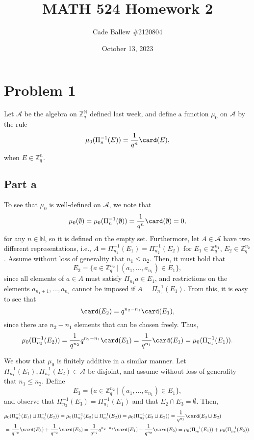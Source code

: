 \documentclass{article}
\title{MATH 524 Homework 2}
\author{Cade Ballew \#2120804}
\date{October 13, 2023}
\begin{document}
	
\maketitle
	
\section{Problem 1}
Let $\mathcal A$ be the algebra on $\mathbb{Z}^\mathbb{N}_q$ defined last week, and define a function $\mu_0$ on $\mathcal A$ by the rule
\[
\mu_0(\Pi_n^{-1}(E))=\frac{1}{q^n}\card(E),
\]
when $E\in\mathbb{Z}^n_q$.
\subsection{Part a}
To see that $\mu_0$ is well-defined on $\mathcal A$, we note that 
\[
\mu_0(\emptyset)=\mu_0(\Pi_n^{-1}(\emptyset))=\frac{1}{q^n}\card(\emptyset)=0,
\]
for any $n\in\mathbb{N}$, so it is defined on the empty set. Furthermore, let $A\in\mathcal A$ have two different representations, i.e., $A=\Pi_{n_1}^{-1}(E_1)=\Pi_{n_2}^{-1}(E_2)$ for $E_1\in\mathbb{Z}_q^{n_1}$, $E_2\in\mathbb{Z}_q^{n_2}$. Assume without loss of generality that $n_1\leq n_2$. Then, it must hold that
\[
E_2=\{a\in\mathbb{Z}^{n_2}_q~|~(a_1,\ldots,a_{n_1})\in E_1\},
\]
since all elements of $a\in A$ must satisfy $\Pi_{n_1}a\in E_1$, and restrictions on the elements $a_{n_1+1},\ldots,a_{n_2}$ cannot be imposed if $A=\Pi_{n_1}^{-1}(E_1)$. From this, it is easy to see that
\[
\card(E_2)=q^{n_2-n_1}\card(E_1),
\]
since there are $n_2-n_1$ elements that can be chosen freely. Thus,
\[
\mu_0(\Pi_{n_2}^{-1}(E_2))=\frac{1}{q^{n_2}}q^{n_2-n_1}\card(E_1)=\frac{1}{q^{n_1}}\card(E_1)=\mu_0(\Pi_{n_1}^{-1}(E_1)).
\]

We show that $\mu_0$ is finitely additive in a similar manner. Let $\Pi_{n_1}^{-1}(E_1),\Pi_{n_2}^{-1}(E_2)\in\mathcal A$ be disjoint, and assume without loss of generality that $n_1\leq n_2$. Define 
\[
E_3=\{a\in\mathbb{Z}^{n_2}_q~|~(a_1,\ldots,a_{n_1})\in E_1\},
\]
and observe that $\Pi_{n_2}^{-1}(E_3)=\Pi_{n_1}^{-1}(E_1)$ and that $E_2\cap E_3=\emptyset$. Then,
\begin{align*}
&\mu_0(\Pi_{n_1}^{-1}(E_1)\sqcup\Pi_{n_2}^{-1}(E_2))=\mu_0(\Pi_{n_2}^{-1}(E_3)\sqcup\Pi_{n_2}^{-1}(E_2))=\mu_0(\Pi_{n_2}^{-1}(E_3\sqcup E_2))=\frac{1}{q^{n_2}}\card(E_3\sqcup E_2)\\&=\frac{1}{q^{n_2}}\card(E_3)+\frac{1}{q^{n_2}}\card(E_2)=\frac{1}{q^{n_2}}q^{n_2-n_1}\card(E_1)+\frac{1}{q^{n_2}}\card(E_2)=\mu_0(\Pi_{n_1}^{-1}(E_1))+\mu_0(\Pi_{n_2}^{-1}(E_2)).
\end{align*}
\end{document}
